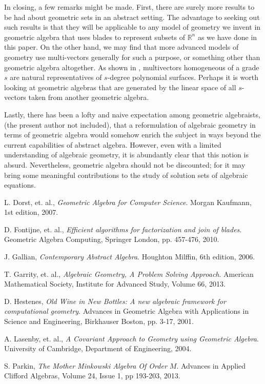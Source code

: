 \documentclass{birkjour}
\theoremstyle{definition}
\theoremstyle{remark}
\numberwithin{equation}{section}
\newcommand{\R}{\mathbb{R}}
\begin{document}
In closing, a few remarks might be made.  First, there are surely more results to be had
about geometric sets in an abstract setting.  The advantage to seeking out such
results is that they will be applicable to any model of geometry we invent
in geometric algebra that uses blades to represent subsets of $\R^n$ as we have
done in this paper.  On the other hand,
we may find that more advanced models of geometry use multi-vectors generally
for such a purpose, or something other than geometric algebra altogether.
As shown in \cite{Parkin13}, multivectors homogeneous of a grade $s$ are
natural representatives of $s$-degree polynomial surfaces.  Perhaps it is
worth looking at geometric algebras that are generated by the linear space
of all $s$-vectors taken from another geometric algebra.

Lastly, there has been a
lofty and naive expectation among geometric algebraists, (the present author not included),
that a reformulation of algebraic geometry in terms of geometric algebra would somehow enrich the subject
in ways beyond the current capabilities of abstract algebra.  However, even with a limited understanding
of algebraic geometry, it is abundantly clear that this notion is absurd.  Nevertheless,
geometric algebra should not be discounted; for it may bring some meaningful
contributions to the study of solution sets of algebraic equations.

\begin{thebibliography}{9}

L. Dorst, et. al.,
\emph{Geometric Algebra for Computer Science}.
Morgan Kaufmann, 1st edition, 2007.

D. Fontijne, et. al.,
\emph{Efficient algorithms for factorization and join of blades}.
Geometric Algebra Computing, Springer London, pp. 457-476, 2010.

J. Gallian,
\emph{Contemporary Abstract Algebra}.
Houghton Milffin, 6th edition, 2006.

T. Garrity, et. al.,
\emph{Algebraic Geometry, A Problem Solving Approach}.
American Mathematical Society, Institute for Advanced Study,
Volume 66, 2013.

D. Hestenes,
\emph{Old Wine in New Bottles: A new algebraic framework for computational geometry}.
Advances in Geometric Algebra with Applications in Science and Engineering,
Birkhauser Boston, pp. 3-17, 2001.

A. Lasenby, et. al.,
\emph{A Covariant Approach to Geometry using Geometric Algebra}.
University of Cambridge, Department of Engineering, 2004.

S. Parkin,
\emph{The Mother Minkowski Algebra Of Order $M$}.
Advances in Applied Clifford Algebras, Volume 24, Issue 1, pp 193-203, 2013.

\end{thebibliography}
\end{document}
